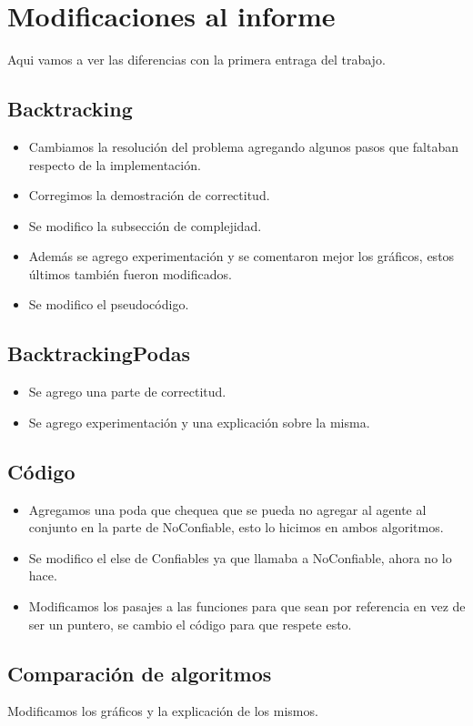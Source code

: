 \section{Modificaciones al informe}
	Aqui vamos a ver las diferencias con la primera entraga del trabajo.

\subsection{Backtracking}
\begin{itemize}
\setlength\itemsep{-0.2em}
\item Cambiamos la resolución del problema agregando algunos pasos que faltaban respecto de la implementación.
\item Corregimos la demostración de correctitud.
\item Se modifico la subsección de complejidad.
\item Además se agrego experimentación y se comentaron mejor los gráficos, estos últimos también fueron modificados.
\item Se modifico el pseudocódigo.
\end{itemize}

\subsection{BacktrackingPodas}
\begin{itemize}
\setlength\itemsep{-0.2em}
\item Se agrego una parte de correctitud.
\item Se agrego experimentación y una explicación sobre la misma.
\end{itemize}

\subsection{Código}
\begin{itemize}
\setlength\itemsep{-0.2em}
\item Agregamos una poda que chequea que se pueda no agregar al agente al conjunto en la parte de NoConfiable, esto lo hicimos en ambos algoritmos.
\item Se modifico el else de Confiables ya que llamaba a NoConfiable, ahora no lo hace.
\item Modificamos los pasajes a las funciones para que sean por referencia en vez de ser un puntero, se cambio el código para que respete esto.
\end{itemize}

\subsection{Comparación de algoritmos}
	Modificamos los gráficos y la explicación de los mismos.